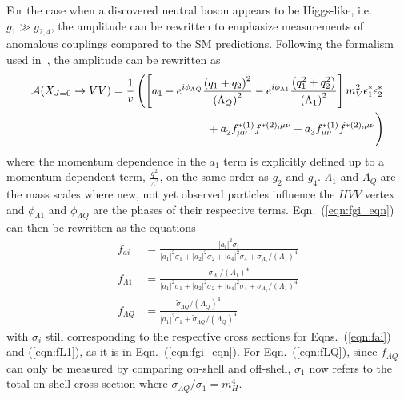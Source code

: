 For the case when a discovered neutral boson appears to be Higgs-like, i.e. $g_1 \gg g_{2,4}$, the amplitude can be rewritten to emphasize measurements of anomalous couplings compared to the SM predictions. Following the formalism used in~\cite{Gao:2010qx,Bolognesi:2012mm,Anderson:2013afp}, the amplitude can be rewritten as
\begin{equation}
\begin{split}
\mathcal{A}(X_{J=0} \rightarrow VV) = \frac{1}{v}\left(\left[ a_{1}  - e^{i\phi_{\Lambda{Q}}} \frac{\left(q_{1} + q_{2}\right)^{2}}{\left(\Lambda_{Q}\right)^{2}} - e^{i\phi_{\Lambda{1}}} \frac{\left(q_{1}^2 + q_{2}^2\right)}{\left(\Lambda_{1}\right)^{2}}\right]m_{V}^2 \epsilon_{1}^*\epsilon_{2}^*   \right. \\
\left. \vphantom{\frac{\left(q_{1} + q_{2}\right)^{2}}{\left(\Lambda_{Q}\right)^{2}}} + a_{2}^{}  f_{\mu \nu}^{*(1)}f^{*(2),\mu\nu} 
+ a_{3}^{}   f^{*(1)}_{\mu \nu} {\tilde f}^{*(2),\mu\nu}\right)
\end{split}
\label{eq:scalarAmpl_wformfactors}
\end{equation}
where the momentum dependence in the $a_1$ term is explicitly defined up to a momentum dependent term, $\frac{q^2}{\Lambda^2}$, on the same order as $g_2$ and $g_4$. $\Lambda_1$ and $\Lambda_{Q}$ are the mass scales where new, not yet observed particles influence the $HVV$ vertex and $\phi_{\Lambda{1}}$ and $\phi_{\Lambda{Q}}$ are the phases of their respective terms. Eqn.~(\ref{eqn:fgi_eqn}) can then be rewritten as the equations
\begin{align}
f_{ai} &= \frac{|a_i|^2\sigma_i}{|a_1|^2\sigma_1 + |a_2|^2\sigma_2 + |a_4|^2\sigma_4 + \sigma_{\Lambda_{1}}/(\Lambda_1)^4} \label{eqn:fai} \\
f_{\Lambda{1}} &= \frac{\sigma_{\Lambda_{1}}/(\Lambda_1)^4}{|a_1|^2\sigma_1 + |a_2|^2\sigma_2 + |a_4|^2\sigma_4 + \sigma_{\Lambda_{1}}/(\Lambda_1)^4} \label{eqn:fL1} \\
f_{\Lambda{Q}} &= \frac{\tilde{\sigma}_{\Lambda{Q}}/\left(\Lambda_Q\right)^4}{|a_1|^2\sigma_1 + \tilde{\sigma}_{\Lambda{Q}}/\left(\Lambda_Q\right)^4} \label{eqn:fLQ}
\end{align}
with $\sigma_i$ still corresponding to the respective cross sections for Eqns.~(\ref{eqn:fai}) and (\ref{eqn:fL1}), as it is in Eqn.~(\ref{eqn:fgi_eqn}). For Eqn.~(\ref{eqn:fLQ}), since $f_{\Lambda{Q}}$ can only be measured by comparing on-shell and off-shell, $\sigma_1$ now refers to the total on-shell cross section where $\tilde{\sigma}_{\Lambda{Q}}/\sigma_{1}=m_{H}^4$.

